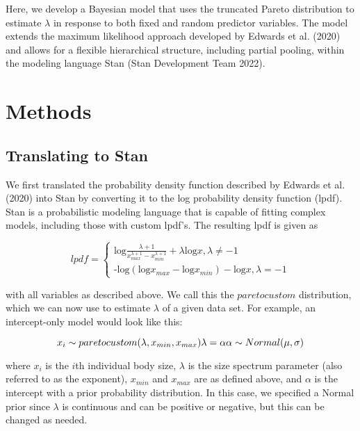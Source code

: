 \documentclass[
  12pt,
]{article}
\begin{document}
Here, we develop a Bayesian model that uses the truncated Pareto
distribution to estimate \(\lambda\) in response to both fixed and
random predictor variables. The model extends the maximum likelihood
approach developed by Edwards et al. (2020) and allows for a flexible
hierarchical structure, including partial pooling, within the modeling
language Stan (Stan Development Team 2022).

\hypertarget{methods}{%
\section{Methods}\label{methods}}

\hypertarget{translating-to-stan}{%
\subsection{Translating to Stan}\label{translating-to-stan}}

We first translated the probability density function described by
Edwards et al. (2020) into Stan by converting it to the log probability
density function (lpdf). Stan is a probabilistic modeling language that
is capable of fitting complex models, including those with custom
lpdf's. The resulting lpdf is given as

\begin{equation}
 lpdf = \begin{cases}\text{log}\frac{\lambda + 1}{{x_{max}^{\lambda+1}} - {x_{min}^{\lambda+1}}} + \lambda\text{log}x, \lambda \neq-1 \\
\text{-log}({{\text{log}x_{max}} - {\text{log}x_{min}}}) -\text{log}x, \lambda = -1\end{cases}
\end{equation}

with all variables as described above. We call this the \(paretocustom\)
distribution, which we can now use to estimate \(\lambda\) of a given
data set. For example, an intercept-only model would look like this:

\begin{equation}x_i \sim paretocustom(\lambda, x_{min}, x_{max})$$ $$\lambda = \alpha$$ $$\alpha \sim Normal(\mu, \sigma)\end{equation}

where \(x_i\) is the \(i\)th individual body size, \(\lambda\) is the
size spectrum parameter (also referred to as the exponent), \(x_{min}\)
and \(x_{max}\) are as defined above, and \(\alpha\) is the intercept
with a prior probability distribution. In this case, we specified a
Normal prior since \(\lambda\) is continuous and can be positive or
negative, but this can be changed as needed.
\end{document}
